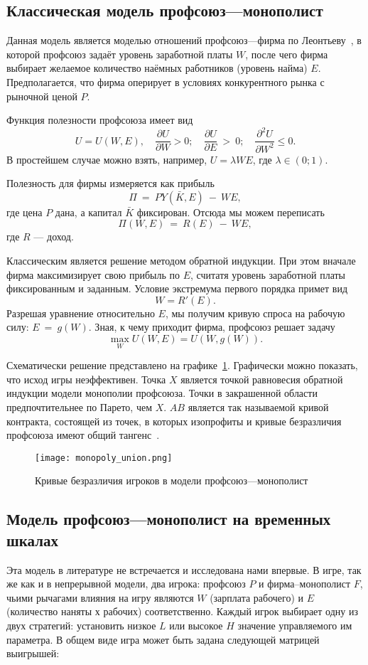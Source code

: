\subsection{Классическая модель профсоюз---монополист}
\label{sec:monopoly}

Данная модель является моделью отношений профсоюз---фирма по
Леонтьеву~\cite{LeontiefW}, в которой профсоюз задаёт уровень заработной платы $W$,
после чего фирма выбирает желаемое количество наёмных работников (уровень
найма) $E$. Предполагается, что фирма оперирует в условиях конкурентного рынка с
рыночной ценой $P$.

Функция полезности профсоюза имеет вид 
$$ 
	U = U(W,E), 
	\quad 
		\frac{\partial U}{\partial W} > 0; 
	\quad 
		\frac{\partial U}{\partial E}~>~0;
	\quad   
		\frac{\partial^2 U}{\partial W^2} \leqslant 0.
$$ 
В простейшем случае можно взять, например, $U = \lambda WE$, где $\lambda \in (0; 1)$.

Полезность для фирмы измеряется как прибыль 
$$
	\Pi~=~PY(\bar K,E)~-~WE,
$$ 
где цена $P$ дана, а капитал $\bar K$ фиксирован. Отсюда мы можем переписать 
$$
	\Pi(W,E)~=~R(E)~-~WE,
$$ 
где $R$ --- доход.

Классическим является решение методом обратной индукции.
При этом вначале фирма максимизирует свою прибыль по $E$, считатя уровень
заработной платы фиксированным и заданным. Условие экстремума первого порядка примет вид 
$$ 
	W = R'(E).
$$
Разрешая уравнение относительно $E$, мы получим кривую спроса на рабочую силу: $E~=~g(W)$.
Зная, к чему приходит фирма, профсоюз решает задачу
$$ 
	\max_W U(W,E) = U(W, g(W)).
$$

Схематически решение представлено на графике~\ref{fig:monopoly_union}.
Графически можно показать, что исход игры неэффективен. Точка $X$ является
точкой равновесия обратной индукции модели монополии профсоюза. Точки в
закрашенной области предпочтительнее по Парето, чем $X$. $AB$ является так называемой 
кривой контракта, состоящей из точек, в которых изопрофиты и кривые безразличия
профсоюза имеют общий тангенс~\cite{ShandongUniver}.


\begin{figure}[h]
	\centering
	\texttt{[image: monopoly\_union.png]}
	\caption{Кривые безразличия игроков в модели профсоюз---монополист}
	\label{fig:monopoly_union}
\end{figure}

\subsection{Модель профсоюз---монополист на временных шкалах}
Эта модель в литературе не встречается и исследована нами впервые.  
В игре, так же как и в непрерывной модели, два игрока: профсоюз $P$ и фирма--монополист
$F$, чьими рычагами влияния на игру являются $W$ (зарплата рабочего) и $E$ 
(количество наняты	х рабочих) соответственно.  Каждый игрок выбирает одну из двух
стратегий: установить низкое $L$ или высокое $H$ значение управляемого им параметра. 
В общем виде игра может быть задана следующей матрицей выигрышей: 

